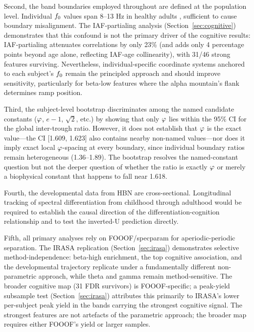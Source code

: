 Second, the band boundaries employed throughout are defined at the population level. Individual $f_0$ values span 8--13 Hz in healthy adults \parencite{klimesch1999eeg,grandy2013iaf}, sufficient to cause boundary misalignment. The IAF-partialing analysis (Section~\ref{sec:cognitive}) demonstrates that this confound is not the primary driver of the cognitive results: IAF-partialing attenuates correlations by only 23\% (and adds only 4 percentage points beyond age alone, reflecting IAF-age collinearity), with 31/46 strong features surviving. Nevertheless, individual-specific coordinate systems anchored to each subject's $f_0$ remain the principled approach and should improve sensitivity, particularly for beta-low features where the alpha mountain's flank determines ramp position.

Third, the subject-level bootstrap discriminates among the named candidate constants ($\varphi$, $e-1$, $\sqrt{2}$, etc.) by showing that only $\varphi$ lies within the 95\% CI for the global inter-trough ratio. However, it does not establish that $\varphi$ is the exact value---the CI [1.609, 1.623] also contains nearby non-named values---nor does it imply exact local $\varphi$-spacing at every boundary, since individual boundary ratios remain heterogeneous (1.36--1.89). The bootstrap resolves the named-constant question but not the deeper question of whether the ratio is exactly $\varphi$ or merely a biophysical constant that happens to fall near 1.618.

Fourth, the developmental data from HBN are cross-sectional. Longitudinal tracking of spectral differentiation from childhood through adulthood would be required to establish the causal direction of the differentiation-cognition relationship and to test the inverted-U prediction directly.

Fifth, all primary analyses rely on FOOOF/specparam for aperiodic-periodic separation. The IRASA replication (Section~\ref{sec:irasa}) demonstrates selective method-independence: beta-high enrichment, the top cognitive association, and the developmental trajectory replicate under a fundamentally different non-parametric approach, while theta and gamma remain method-sensitive. The broader cognitive map (31 FDR survivors) is FOOOF-specific; a peak-yield subsample test (Section~\ref{sec:irasa}) attributes this primarily to IRASA's lower per-subject peak yield in the bands carrying the strongest cognitive signal. The strongest features are not artefacts of the parametric approach; the broader map requires either FOOOF's yield or larger samples.

